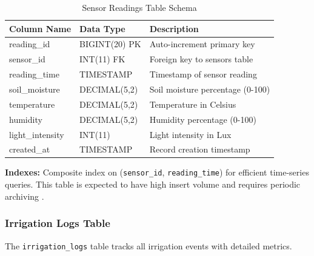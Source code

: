 \begin{table}[H]
\centering
\small
\begin{tabular}{|l|l|p{6cm}|}
\hline
\textbf{Column Name} & \textbf{Data Type} & \textbf{Description} 
\\ \hline
reading\_id & BIGINT(20) PK & Auto-increment primary key \\ \hline
sensor\_id & INT(11) FK & Foreign key to sensors table \\ \hline
reading\_time & TIMESTAMP & Timestamp of sensor reading \\ \hline
soil\_moisture & DECIMAL(5,2) & Soil moisture percentage (0-100) 
\\ \hline
temperature & DECIMAL(5,2) & Temperature in Celsius \\ \hline
humidity & DECIMAL(5,2) & Humidity percentage (0-100) \\ \hline
light\_intensity & INT(11) & Light intensity in Lux \\ \hline
created\_at & TIMESTAMP & Record creation timestamp \\ \hline
\end{tabular}
\caption{Sensor Readings Table Schema}
\label{tab:sensor-readings-schema}
\end{table}

\textbf{Indexes:} Composite index on (\texttt{sensor\_id}, 
\texttt{reading\_time}) for efficient time-series queries. This 
table is expected to have high insert volume and requires periodic 
archiving \cite{uotila2020db}.

\subsubsection{Irrigation Logs Table}
The \texttt{irrigation\_logs} table tracks all irrigation events 
with detailed metrics.

